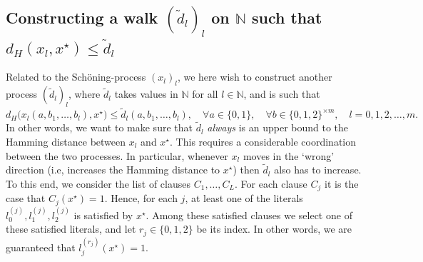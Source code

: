\documentclass[a4paper,aps,floatfix]{revtex4}
\begin{document}

\subsection{Constructing a walk $(\tilde{d}_l)_l$ on  $\mathbb{N}$ such that $d_H(x_l,x^{\star})\leq \tilde{d}_l$}

Related to the Sch\"oning-process $(x_l)_l$, we here wish to construct  another process $(\tilde{d}_l)_l$, where $\tilde{d}_l$ takes values in $\mathbb{N}$ for all $l\in\mathbb{N}$, and is such that 
   \begin{equation}
d_H\big(x_l(a,b_{1},\ldots, b_{l}),x^{\star}\big) \leq \tilde{d}_l(a,b_{1},\ldots, b_{l}),\quad \forall a\in\{0,1\},\quad \forall b\in\{0,1,2\}^{\times m},\quad l = 0,1,2,\ldots,m.
\end{equation}
In other words, we want to make sure that  $\tilde{d}_l$ \emph{always} is an upper bound to the Hamming distance between $x_l$ and $x^{\star}$.
This requires a considerable coordination between the two processes. In particular, whenever $x_l$ moves in the `wrong' direction (i.e, increases the Hamming distance to $x^{\star}$) then $\tilde{d}_l$ also has to increase. 
To this end, we consider the list of clauses $C_{1},\ldots, C_L$. For each clause $C_j$  it is the case that $C_j(x^{\star}) = 1$. Hence, for each $j$, at least one of the literals  $l_0^{(j)},l_1^{(j)},l_2^{(j)}$ is satisfied by $x^{\star}$. Among these satisfied clauses we select one of these satisfied literals, and let $r_j\in\{0,1,2\}$ be its index. In other words, we are guaranteed that $l_j^{(r_j)}(x^{\star}) = 1$.  
\end{document}
